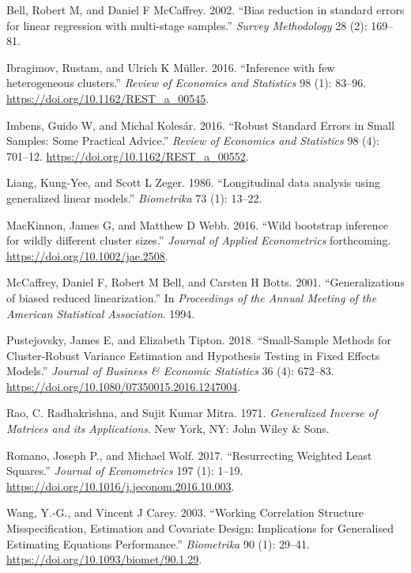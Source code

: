 \documentclass[12pt]{article}
\newlength{\cslhangindent}
\newlength{\cslentryspacingunit} %
\newenvironment{CSLReferences}[2] %
 {%
  \setlength{\parindent}{0pt}
  \ifodd #1
  \let\oldpar\par
  \def\par{\hangindent=\cslhangindent\oldpar}
  \fi
  \setlength{\parskip}{#2\cslentryspacingunit}
 }%
 {}
\begin{document}
\hypertarget{refs}{}
\begin{CSLReferences}{1}{0}
\leavevmode{}%
Bell, Robert M, and Daniel F McCaffrey. 2002. {``{Bias reduction in
standard errors for linear regression with multi-stage samples}.''}
\emph{Survey Methodology} 28 (2): 169--81.

\leavevmode{}%
Ibragimov, Rustam, and Ulrich K Müller. 2016. {``{Inference with few
heterogeneous clusters}.''} \emph{Review of Economics and Statistics} 98
(1): 83--96. \url{https://doi.org/10.1162/REST_a_00545}.

\leavevmode{}%
Imbens, Guido W, and Michal Kolesár. 2016. {``Robust Standard Errors in
Small Samples: Some Practical Advice.''} \emph{Review of Economics and
Statistics} 98 (4): 701--12. \url{https://doi.org/10.1162/REST_a_00552}.

\leavevmode{}%
Liang, Kung-Yee, and Scott L Zeger. 1986. {``{Longitudinal data analysis
using generalized linear models}.''} \emph{Biometrika} 73 (1): 13--22.

\leavevmode{}%
MacKinnon, James G, and Matthew D Webb. 2016. {``{Wild bootstrap
inference for wildly different cluster sizes}.''} \emph{Journal of
Applied Econometrics} forthcoming.
\url{https://doi.org/10.1002/jae.2508}.

\leavevmode{}%
McCaffrey, Daniel F, Robert M Bell, and Carsten H Botts. 2001.
{``{Generalizations of biased reduced linearization}.''} In
\emph{Proceedings of the Annual Meeting of the American Statistical
Association}. 1994.

\leavevmode{}%
Pustejovsky, James E, and Elizabeth Tipton. 2018. {``Small-Sample
Methods for Cluster-Robust Variance Estimation and Hypothesis Testing in
Fixed Effects Models.''} \emph{Journal of Business \& Economic
Statistics} 36 (4): 672--83.
\url{https://doi.org/10.1080/07350015.2016.1247004}.

\leavevmode{}%
Rao, C. Radhakrishna, and Sujit Kumar Mitra. 1971. \emph{{Generalized
Inverse of Matrices and its Applications}}. New York, NY: John Wiley \&
Sons.

\leavevmode{}%
Romano, Joseph P., and Michael Wolf. 2017. {``Resurrecting Weighted
Least Squares.''} \emph{Journal of Econometrics} 197 (1): 1--19.
\url{https://doi.org/10.1016/j.jeconom.2016.10.003}.

\leavevmode{}%
Wang, Y.-G., and Vincent J Carey. 2003. {``Working Correlation Structure
Misspecification, Estimation and Covariate Design: Implications for
Generalised Estimating Equations Performance.''} \emph{Biometrika} 90
(1): 29--41. \url{https://doi.org/10.1093/biomet/90.1.29}.

\end{CSLReferences}



\end{document}
